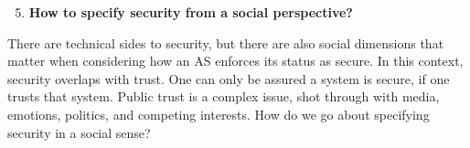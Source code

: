 \documentclass[sigconf,nonacm]{acmart}%
\begin{document}
	
	\begin{enumerate}[leftmargin=0.5cm]
		\setcounter{enumi}{4}
		\item \noindent\textbf{How to specify security from a social perspective?} 
	\end{enumerate}
	There are technical sides to security, but there are also social dimensions that matter when considering how an AS enforces its status as secure. In this context, security overlaps with trust. One can only be assured a system is secure, if one trusts that system. Public trust is a complex issue, shot through with media, emotions, politics, and competing interests. How do we go about specifying security in a social sense? 
	
\end{document}
